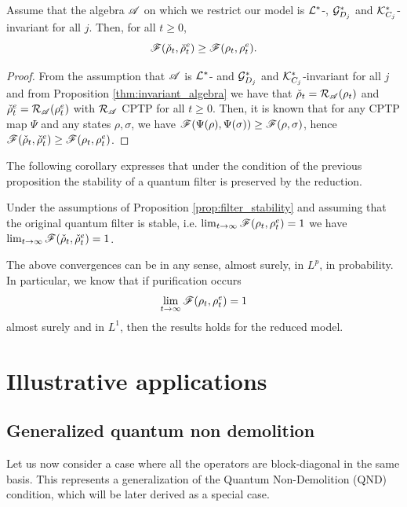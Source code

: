 \documentclass[aihp,12pt]{imsart}
\begin{document}
\begin{proposition}
\label{prop:filter_stability}
    Assume that the algebra $\mathscr{A}$ on which we restrict our model is $\mathcal{L}^*$-, $\mathcal{G}_{D_j}^*$ and $\mathcal{K}_{C_j}^*$-invariant for all $j$. Then, for all $t\geq 0$, $$\mathscr{F}(\check{\rho}_t,\check{\rho}_t^e)\geq\mathscr{F}(\rho_t,\rho_t^e).$$
\end{proposition}
\begin{proof}
From the assumption that $\mathscr{A}$ is $\mathcal{L}^*$- and $\mathcal{G}_{D_j}^*$ and $\mathcal{K}_{C_j}^*$-invariant for all $j$ and from Proposition \ref{thm:invariant_algebra} we have that $\check{\rho}_t=\mathcal{R}_{\mathscr{A}}(\rho_t)$ and $\check{\rho}_t^e=\mathcal{R}_{\mathscr{A}}(\rho_t^e)$ with $\mathcal{R}_{\mathscr{A}}$ CPTP for all $t\geq0$. Then, it is known that for any CPTP map $\Psi$ and any states $\rho,\sigma$, we have $\mathscr{F}(\Psi(\rho),\Psi(\sigma))\geq \mathscr{F}(\rho,\sigma)$, hence $\mathscr{F}(\check{\rho}_t,\check{\rho}_t^e)\geq\mathscr{F}(\rho_t,\rho_t^e)$.
\end{proof}

The following corollary expresses that under the condition of the previous proposition the stability of a quantum filter is preserved by the reduction.

\begin{corollary}
Under the assumptions of Proposition \ref{prop:filter_stability} and assuming that the original quantum filter is stable, i.e. $\lim_{t\to\infty}\mathscr{F}(\rho_t,\rho_t^e) =1$ we have $\lim_{t\to\infty}\mathscr{F}(\check{\rho}_t,\check{\rho}_t^e)=1$.
\end{corollary}

The above convergences can be in any sense, almost surely, in $L^p$, in probability. In particular, we know that if purification occurs
$$\lim_{t\to\infty} \mathscr{F}(\rho_t,\rho^{e}_t)=1$$
almost surely and in $L^1$\cite{amini2021asymptotic}, then the results holds for the reduced model.


\section{Illustrative applications}
\label{sec:examples}
\subsection{Generalized quantum non demolition}\label{sec:qnd}
Let us now consider a case where all the operators are block-diagonal in the same basis. This represents a generalization of the Quantum Non-Demolition (QND) condition, which will be later derived as a special case. 
\end{document}
